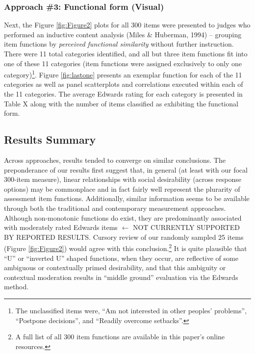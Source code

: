 \documentclass[
  ,jou]{apa6}
\begin{document}
\hypertarget{approach-3-functional-form-visual}{%
\subsubsection{Approach \#3: Functional form (Visual)}\label{approach-3-functional-form-visual}}

Next, the Figure \ref{fig:Figure2} plots for all 300 items were presented to judges who performed an inductive content analysis (Miles \& Huberman, 1994) -- grouping item functions by \emph{perceived functional similarity} without further instruction. There were 11 total categories identified, and all but three item functions fit into one of these 11 categories (item functions were assigned exclusively to only one category)\footnote{The unclassified items were, ``Am not interested in other peoples' problems'', ``Postpone decisions'', and ``Readily overcome setbacks''.}. Figure \ref{fig:lastone} presents an exemplar function for each of the 11 categories as well as panel scatterplots and correlations executed within each of the 11 categories. The average Edwards rating for each category is presented in Table X along with the number of items classified as exhibiting the functional form.

\hypertarget{results-summary}{%
\subsection{Results Summary}\label{results-summary}}

Across approaches, results tended to converge on similar conclusions. The preponderance of our results first suggest that, in general (at least with our focal 300-item measure), linear relationships with social desirability (across response options) may be commonplace and in fact fairly well represent the plurarity of assessment item functions. Additionally, similar information seems to be available through both the traditional and contemporary measurement approaches. Although non-monotonic functions do exist, they are predominantly associated with moderately rated Edwards items \(\leftarrow\) NOT CURRENTLY SUPPORTED BY REPORTED RESULTS. Cursory review of our randomly sampled 25 items (Figure \ref{fig:Figure2}) would agree with this conclusion.\footnote{A full list of all 300 item functions are available in this paper's online resources.} It is quite plausible that ``U'' or ``inverted U'' shaped functions, when they occur, are reflective of some ambiguous or contextually primed desirability, and that this ambiguity or contextual moderation results in ``middle ground'' evaluation via the Edwards method.
\end{document}
